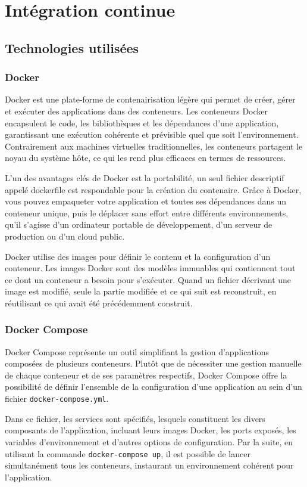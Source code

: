 \section{Intégration continue}
\subsection{Technologies utilisées}
\subsubsection{Docker}
Docker est une plate-forme de contenairisation légère qui permet de créer, gérer et exécuter des applications dans des conteneurs.
Les conteneurs Docker encapsulent le code, les bibliothèques et les dépendances d'une application, garantissant une exécution cohérente et prévisible quel que soit l'environnement.
Contrairement aux machines virtuelles traditionnelles, les conteneurs partagent le noyau du système hôte, ce qui les rend plus efficaces en termes de ressources.

L'un des avantages clés de Docker est la portabilité, un seul fichier descriptif appelé dockerfile est respondable pour la création du contenaire.
Grâce à Docker, vous pouvez empaqueter votre application et toutes ses dépendances dans un conteneur unique, puis le déplacer sans effort entre différents environnements, qu'il s'agisse d'un ordinateur portable de développement, d'un serveur de production ou d'un cloud public.

Docker utilise des images pour définir le contenu et la configuration d'un conteneur.
Les images Docker sont des modèles immuables qui contiennent tout ce dont un conteneur a besoin pour s'exécuter.
Quand un fichier décrivant une image est modifié, seule la partie modifiée et ce qui suit est reconstruit, en réutilisant ce qui avait été précédemment construit.

\subsubsection{Docker Compose}
Docker Compose représente un outil simplifiant la gestion d'applications composées de plusieurs conteneurs.
Plutôt que de nécessiter une gestion manuelle de chaque conteneur et de ses paramètres respectifs, Docker Compose offre la possibilité de définir l'ensemble de la configuration d'une application au sein d'un fichier \texttt{docker-compose.yml}.

Dans ce fichier, les services sont spécifiés, lesquels constituent les divers composants de l'application, incluant leurs images Docker, les ports exposés, les variables d'environnement et d'autres options de configuration.
Par la suite, en utilisant la commande \texttt{docker-compose up}, il est possible de lancer simultanément tous les conteneurs, instaurant un environnement cohérent pour l'application.

